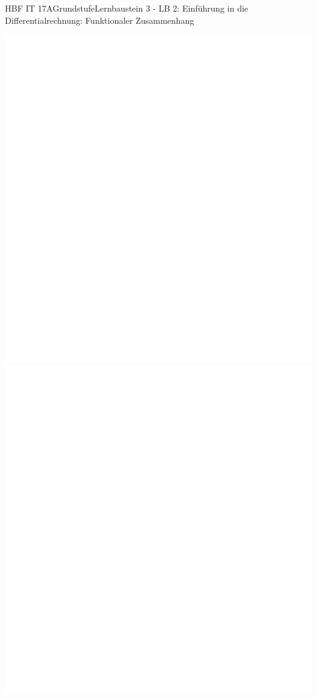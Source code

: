\documentclass[oneside,openany,headings=optiontotoc,11pt,numbers=noenddot]{scrreprt}
\begin{document}
\begin{worksheet}{HBF IT 17A}{Grundstufe}{Lernbaustein 3 - LB 2: Einführung in die Differentialrechnung: Funktionaler Zusammenhang}
\begin{framed}
			\includegraphics[scale=0.5]{../empty.jpg}\\
			\includegraphics[scale=0.55]{../empty.jpg}\\

\end{framed}
\end{worksheet}
\end{document}
